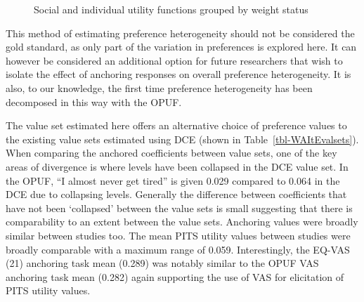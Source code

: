 \documentclass[
  letterpaper,
  DIV=11,
  numbers=noendperiod]{scrartcl}
\begin{document}
\begin{figure}


\caption{\label{fig-weight}Social and individual utility functions
grouped by weight status}

\end{figure}%

This method of estimating preference heterogeneity should not be
considered the gold standard, as only part of the variation in
preferences is explored here. It can however be considered an additional
option for future researchers that wish to isolate the effect of
anchoring responses on overall preference heterogeneity. It is also, to
our knowledge, the first time preference heterogeneity has been
decomposed in this way with the OPUF.

The value set estimated here offers an alternative choice of preference
values to the existing value sets estimated using DCE (shown in
Table~\ref{tbl-WAItEvalsets}). When comparing the anchored coefficients
between value sets, one of the key areas of divergence is where levels
have been collapsed in the DCE value set. In the OPUF, ``I almost never
get tired'' is given 0.029 compared to 0.064 in the DCE due to
collapsing levels. Generally the difference between coefficients that
have not been `collapsed' between the value sets is small suggesting
that there is comparability to an extent between the value sets.
Anchoring values were broadly similar between studies too. The mean PITS
utility values between studies were broadly comparable with a maximum
range of 0.059. Interestingly, the EQ-VAS (21) anchoring task mean
(0.289) was notably similar to the OPUF VAS anchoring task mean (0.282)
again supporting the use of VAS for elicitation of PITS utility values.
\end{document}
